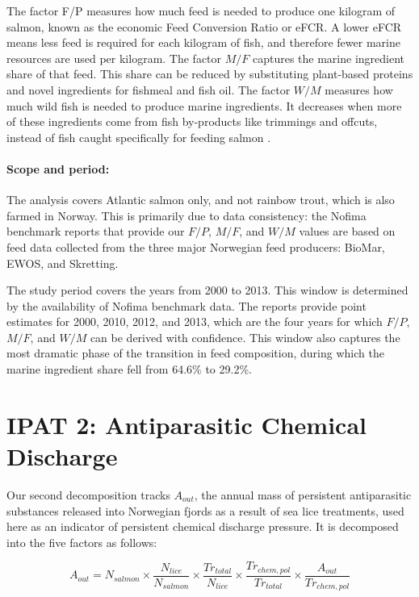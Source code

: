 \documentclass[12pt, a4paper]{report}
\begin{document}
The factor F/P measures how much feed is needed to produce one kilogram of salmon, known as the economic Feed Conversion Ratio or eFCR. A lower eFCR means less feed is required for each kilogram of fish, and therefore fewer marine resources are used per kilogram. The factor $M/F$ captures the marine ingredient share of that feed. This share can be reduced by substituting plant-based proteins and novel ingredients for fishmeal and fish oil.
The factor $W/M$ measures how much wild fish is needed to produce marine ingredients. It decreases when more of these ingredients come from fish by-products like trimmings and offcuts, instead of fish caught specifically for feeding salmon \citep{tacon2008, ytrestoeyl2015}.

\paragraph{Scope and period:}

The analysis covers Atlantic salmon only, and not rainbow trout, which
is also farmed in Norway. This is primarily due to data consistency:
the Nofima benchmark reports that provide our $F/P$, $M/F$, and $W/M$
values are based on feed data collected from the three major Norwegian
feed producers: BioMar, EWOS, and Skretting. 

The study period covers the years from 2000 to 2013. This window is determined by the availability of Nofima benchmark data. The reports provide point estimates for 2000, 2010, 2012, and 2013, which are the four years for which $F/P$, $M/F$, and $W/M$ can be derived with confidence. This window also captures the most dramatic phase of the transition in feed composition, during which the marine ingredient share fell from 64.6\% to 29.2\%.

\section{IPAT 2: Antiparasitic Chemical Discharge}

Our second decomposition tracks $A_{out}$, the annual mass of
persistent antiparasitic substances released into Norwegian fjords
as a result of sea lice treatments, used here as an indicator of
persistent chemical discharge pressure. It is decomposed into the five
 factors as follows:

\begin{equation}
    A_{out} = N_{salmon}
    \times \frac{N_{lice}}{N_{salmon}}
    \times \frac{Tr_{total}}{N_{lice}}
    \times \frac{Tr_{chem,pol}}{Tr_{total}}
    \times \frac{A_{out}}{Tr_{chem,pol}}
\end{equation}
\end{document}
